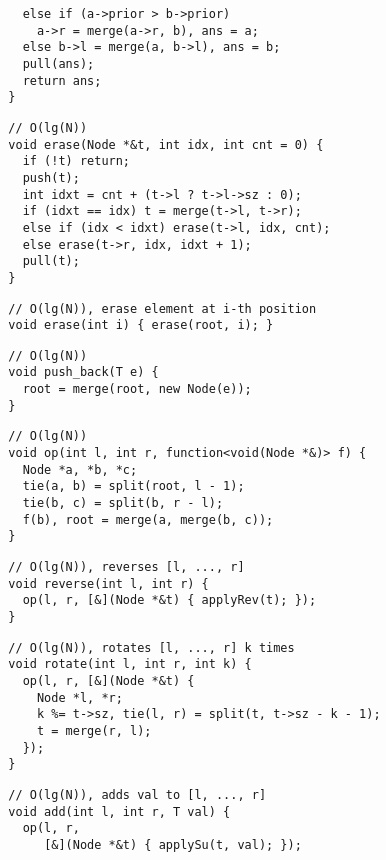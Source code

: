 \documentclass[twoside]{article}
\begin{document}
\begin{multicols*}{2}
\begin{verbatim}
    else if (a->prior > b->prior)
      a->r = merge(a->r, b), ans = a;
    else b->l = merge(a, b->l), ans = b;
    pull(ans);
    return ans;
  }
\end{verbatim}
\vspace{-12pt}
\begin{verbatim}
  // O(lg(N))
  void erase(Node *&t, int idx, int cnt = 0) {
    if (!t) return;
    push(t);
    int idxt = cnt + (t->l ? t->l->sz : 0);
    if (idxt == idx) t = merge(t->l, t->r);
    else if (idx < idxt) erase(t->l, idx, cnt);
    else erase(t->r, idx, idxt + 1);
    pull(t);
  }
\end{verbatim}
\vspace{-12pt}
\begin{verbatim}
  // O(lg(N)), erase element at i-th position
  void erase(int i) { erase(root, i); }
\end{verbatim}
\vspace{-12pt}
\begin{verbatim}
  // O(lg(N))
  void push_back(T e) {
    root = merge(root, new Node(e));
  }
\end{verbatim}
\vspace{-12pt}
\begin{verbatim}
  // O(lg(N))
  void op(int l, int r, function<void(Node *&)> f) {
    Node *a, *b, *c;
    tie(a, b) = split(root, l - 1);
    tie(b, c) = split(b, r - l);
    f(b), root = merge(a, merge(b, c));
  }
\end{verbatim}
\vspace{-12pt}
\begin{verbatim}
  // O(lg(N)), reverses [l, ..., r]
  void reverse(int l, int r) {
    op(l, r, [&](Node *&t) { applyRev(t); });
  }
\end{verbatim}
\vspace{-12pt}
\begin{verbatim}
  // O(lg(N)), rotates [l, ..., r] k times
  void rotate(int l, int r, int k) {
    op(l, r, [&](Node *&t) {
      Node *l, *r;
      k %= t->sz, tie(l, r) = split(t, t->sz - k - 1);
      t = merge(r, l);
    });
  }
\end{verbatim}
\vspace{-12pt}
\begin{verbatim}
  // O(lg(N)), adds val to [l, ..., r]
  void add(int l, int r, T val) {
    op(l, r,
       [&](Node *&t) { applySu(t, val); });

\end{verbatim}
\end{multicols*}
\end{document}
